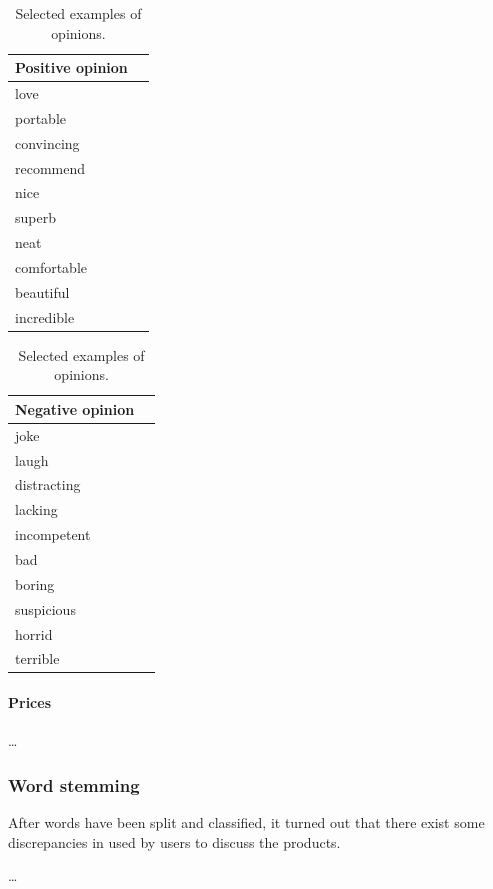         \begin{table}[H]
          \begin{subtable}{0.49\textwidth}
            \centering
            \begin{tabularx}{0.75\textwidth}{|L{1}|L{1}|} \hline
               \textbf{Positive opinion} \\\hline
              love \\
              portable \\
              convincing \\
              recommend \\
              nice \\
              superb \\
              neat \\
              comfortable \\
              beautiful \\
              incredible \\
              \hline
            \end{tabularx}
            \caption{Selected examples of positive opinions.}
            \label{tab:positiveopinionsexamples}
          \end{subtable}
          \begin{subtable}{0.49\textwidth}
            \centering
            \begin{tabularx}{0.75\textwidth}{|L{1}|L{1}|} \hline
               \textbf{Negative opinion} \\\hline
              joke \\
              laugh \\
              distracting \\
              lacking \\
              incompetent \\
              bad \\
              boring \\
              suspicious \\
              horrid \\
              terrible \\
              \hline
            \end{tabularx}
            \caption{Selected examples of negative opinions.}
            \label{tab:negativeopinionsexamples}
          \end{subtable}
          \caption{Selected examples of opinions.}
          \label{tab:opinionsexamples}
        \end{table}

      \paragraph{Prices}
      
        \ldots

    \subsubsection{Word stemming}
    
      After words have been split and classified, it turned out that there exist some discrepancies in  used by users to discuss the products.
      
      \ldots
